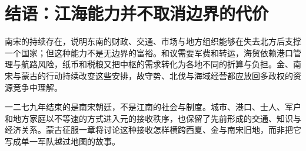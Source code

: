 \section{结语：江海能力并不取消边界的代价}

南宋的持续存在，说明东南的财政、交通、市场与地方组织能够在失去北方后支撑一个国家；但这种能力不是无边界的富裕。和议需要军费和转运，海贸依赖港口管理与航路风险，纸币和税粮又把中枢的需求转化为各地不同的折算与负担。金、南宋与蒙古的行动持续改变这些安排，故守势、北伐与海域经营都应放回多政权的资源竞争中理解。

一二七九年结束的是南宋朝廷，不是江南的社会与制度。城市、港口、士人、军户和地方家庭以不等速的方式进入元的接收秩序，也保留了先前形成的交通、知识与经济关系。蒙古征服一章将讨论这种接收怎样横跨西夏、金与南宋旧地，而非把它写成单一军队越过地图的故事。
